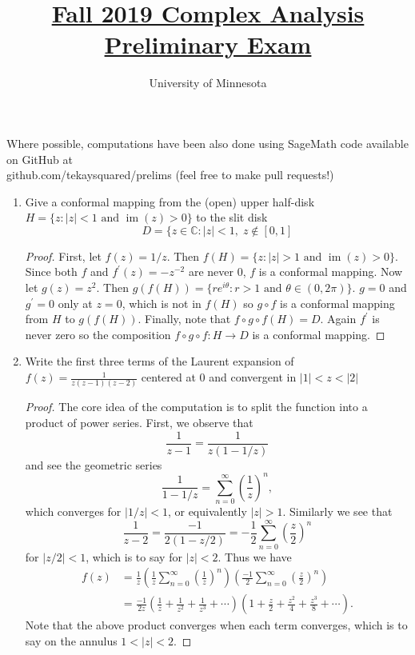 \documentclass{article}
\title{\href{https://math.umn.edu/sites/math.umn.edu/files/exams/complexf19.pdf}{Fall 2019 Complex Analysis Preliminary Exam}}
\author{University of Minnesota}
\date{}
\DeclareMathOperator{\im}{im}
\begin{document}
\maketitle

Where possible, computations have been also done using SageMath code available on GitHub at \\ github.com/tekaysquared/prelims (feel free to make pull requests!)

\begin{enumerate}
	\item Give a conformal mapping from the (open) upper half-disk $H = \{z : |z|<1 \text{ and } \im(z) > 0\}$ to the slit disk
	\[D = \{ z \in \mathbb{C} : |z|< 1,\;z \not \in [0,1] \]
	
	\begin{proof}
		First, let $f(z) = 1/z$. Then $f(H) = \{ z : |z|>1 \text{ and } \im(z) > 0 \}$. Since both $f$ and $f^\prime(z) = -z^{-2}$ are never $0$, 
		$f$ is a conformal mapping.
		Now let $g(z) = z^2$. Then $g(f(H)) = \{ re^{i \theta} : r > 1 \text{ and } \theta \in (0, 2\pi) \}$. 
		$g=0$ and $g^\prime = 0$ only at $z = 0$, which is not in $f(H)$ so $g \circ f$ is a conformal mapping from $H$ to $g(f(H))$.
		Finally, note that $f \circ g \circ f(H) = D$. 
		Again $f^\prime$ is never zero so the composition $f \circ g \circ f : H \rightarrow D$ is a conformal mapping.
	\end{proof}

	\setcounter{enumi}{1}
	
	\item Write the first three terms of the Laurent expansion of $\displaystyle f(z) = \frac{1}{z(z-1)(z-2)}$ centered at $0$ and convergent in $|1| < z < |2|$
	
	\begin{proof}
		The core idea of the computation is to split the function into a product of power series.
		First, we observe that 
		\[ \frac{1}{z-1} = \frac{1}{z(1-1/z)}\] 
		and see the geometric series 
		\[ \frac{1}{1-1/z} = \sum_{n=0}^\infty \left( \frac{1}{z} \right)^n,\]
		which converges for $|1/z| < 1$, or equivalently $|z|>1$.
		Similarly we see that 
		\[ \frac{1}{z-2} = \frac{-1}{2(1-z/2)} = -\frac{1}{2} \sum_{n=0}^\infty \left ( \frac{z}{2} \right )^n \]
		for $|z/2| < 1$, which is to say for $|z|< 2$.
		Thus we have
		\begin{align*}
			f(z) &= \frac{1}{z} \left ( \frac{1}{z} \sum_{n=0}^\infty \left ( \frac{1}{z} \right )^n \right ) \left ( \frac{-1}{2} \sum_{n=0}^\infty \left( \frac{z}{2} \right)^n \right )\\
			&= \frac{-1}{2z} \left (\frac{1}{z} + \frac{1}{z^2} + \frac{1}{z^3} + \cdots  \right) \left ( 1 + \frac{z}{2}+\frac{z^2}{4}+\frac{z^3}{8}+\cdots \right ).
		\end{align*}
		Note that the above product converges when each term converges, which is to say on the annulus $1 < |z| < 2$.
	

\end{proof}
\end{enumerate}
\end{document}
